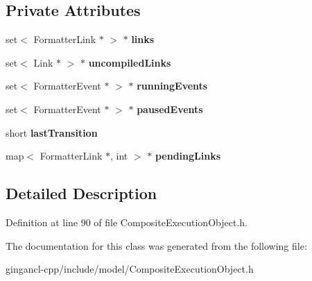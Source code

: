 \subsection*{Private Attributes}
\begin{CompactItemize}
\item 
set$<$ FormatterLink $\ast$ $>$ $\ast$ {\bf links}\label{classbr_1_1pucrio_1_1telemidia_1_1ginga_1_1ncl_1_1model_1_1components_1_1CompositeExecutionObject_894d017c429516fe3b1619dcb6cd6391}

\item 
set$<$ Link $\ast$ $>$ $\ast$ {\bf uncompiledLinks}\label{classbr_1_1pucrio_1_1telemidia_1_1ginga_1_1ncl_1_1model_1_1components_1_1CompositeExecutionObject_f244f73baa0380c5d978715febd914e1}

\item 
set$<$ FormatterEvent $\ast$ $>$ $\ast$ {\bf runningEvents}\label{classbr_1_1pucrio_1_1telemidia_1_1ginga_1_1ncl_1_1model_1_1components_1_1CompositeExecutionObject_8d911e04a472a1c98eb867d18f5d3cf0}

\item 
set$<$ FormatterEvent $\ast$ $>$ $\ast$ {\bf pausedEvents}\label{classbr_1_1pucrio_1_1telemidia_1_1ginga_1_1ncl_1_1model_1_1components_1_1CompositeExecutionObject_43417cb0025d8a1f90f8b07244cf70b5}

\item 
short {\bf lastTransition}\label{classbr_1_1pucrio_1_1telemidia_1_1ginga_1_1ncl_1_1model_1_1components_1_1CompositeExecutionObject_72a29d1b80fc78ca433be31f3f9de7c3}

\item 
map$<$ FormatterLink $\ast$, int $>$ $\ast$ {\bf pendingLinks}\label{classbr_1_1pucrio_1_1telemidia_1_1ginga_1_1ncl_1_1model_1_1components_1_1CompositeExecutionObject_70a778f4f5eb2a720aa31be7c7a16c9f}

\end{CompactItemize}


\subsection{Detailed Description}




Definition at line 90 of file CompositeExecutionObject.h.

The documentation for this class was generated from the following file:\begin{CompactItemize}
\item 
gingancl-cpp/include/model/CompositeExecutionObject.h\end{CompactItemize}
